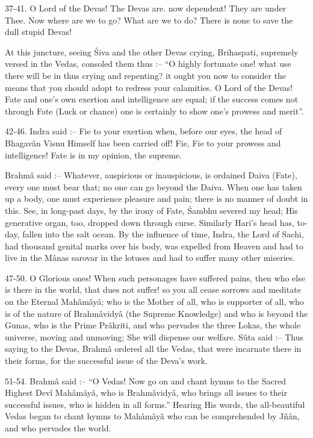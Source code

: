 37-41. O Lord of the Devas! The Devas are. now dependent! They are under Thee. Now where are we to go? What are we to do? There is none to save the dull stupid Devas!

At this juncture, seeing \'Siva and the other Devas crying, Brihaspati, supremely versed in the Vedas, consoled them thus :-- ``O highly fortunate one! what use there will be in thus crying and repenting? it ought you now to consider the means that you should adopt to redress your calamities. O Lord of the Devas! Fate and one's own exertion and intelligence are equal; if the success comes not through Fate (Luck or chance) one is certainly to show one's prowess and merit''.

42-46. Indra said :-- Fie to your exertion when, before our eyes, the head of Bhagav\^an Visnu Himself has been carried off! Fie, Fie to your prowess and intelligence! Fate is in my opinion, the supreme.

Brahm\^a said :-- Whatever, auspicious or inauspicious, is ordained Daiva (Fate), every one must bear that; no one can go beyond the Daiva. When one has taken up a body, one must experience pleasure and pain; there is no manner of doubt in this. See, in long-past days, by the irony of Fate, \'Sambhu severed my head; His generative organ, too, dropped down through curse. Similarly Hari's head has, to-day, fallen into the salt ocean. By the influence of time, Indra, the Lord of Sachi, had thousand genital marks over his body, was expelled from Heaven and had to live in the M\^anas sarovar in the lotuses and had to suffer many other miseries.

47-50. O Glorious ones! When such personages have suffered pains, then who else is there in the world, that dues not suffer! so you all cease sorrows and meditate on the Eternal Mah\^am\^ay\^a; who is the Mother of all, who is supporter of all, who is of the nature of Brahm\^avidy\^a (the Supreme Knowledge) and who is beyond the Gunas, who is the Prime Pr\^akriti, and who pervades the three Lokas, the whole universe, moving and unmoving; She will dispense our welfare. S\^uta said :-- Thus saying to the Devas, Brahm\^a ordered all the Vedas, that were incarnate there in their forms, for the successful issue of the Deva's work.

51-54. Brahm\^a said :-- ``O Vedas! Now go on and chant hymns to the Sacred Highest Dev\^i Mah\^am\^ay\^a, who is Brahm\^avidy\^a, who brings all issues to their successful issues, who is hidden in all forms.'' Hearing His words, the all-beautiful Vedas began to chant hymns to Mah\^am\^ay\^a who can be comprehended by Jñ\^an, and who pervades the world.

